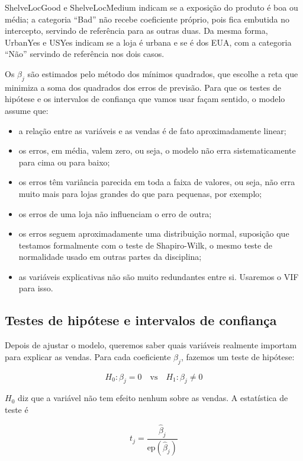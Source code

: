 \documentclass[a4paper]{modeloUFCG} %
\begin{document}
ShelveLocGood e ShelveLocMedium indicam se a exposição do produto é boa ou média; a categoria ``Bad'' não recebe coeficiente próprio, pois fica embutida no intercepto, servindo de referência para as outras duas. Da mesma forma, UrbanYes e USYes indicam se a loja é urbana e se é dos EUA, com a categoria ``Não'' servindo de referência nos dois casos.

Os \(\beta_j\) são estimados pelo método dos mínimos quadrados, que escolhe a reta que minimiza a soma dos quadrados dos erros de previsão. Para que os testes de hipótese e os intervalos de confiança que vamos usar façam sentido, o modelo assume que:

\begin{itemize}
\tightlist
\item
  a relação entre as variáveis e as vendas é de fato aproximadamente linear;
\item
  os erros, em média, valem zero, ou seja, o modelo não erra sistematicamente para cima ou para baixo;
\item
  os erros têm variância parecida em toda a faixa de valores, ou seja, não erra muito mais para lojas grandes do que para pequenas, por exemplo;
\item
  os erros de uma loja não influenciam o erro de outra;
\item
  os erros seguem aproximadamente uma distribuição normal, suposição que testamos formalmente com o teste de Shapiro-Wilk, o mesmo teste de normalidade usado em outras partes da disciplina;
\item
  as variáveis explicativas não são muito redundantes entre si. Usaremos o VIF para isso.
\end{itemize}

\subsection{Testes de hipótese e intervalos de confiança}\label{testes-de-hipuxf3tese-e-intervalos-de-confianuxe7a}

Depois de ajustar o modelo, queremos saber quais variáveis realmente importam para explicar as vendas. Para cada coeficiente \(\beta_j\), fazemos um teste de hipótese:

\[
H_0: \beta_j = 0 \quad \text{vs} \quad H_1: \beta_j \neq 0
\]

\(H_0\) diz que a variável não tem efeito nenhum sobre as vendas. A estatística de teste é

\[
t_j = \frac{\hat{\beta}_j}{\text{ep}(\hat{\beta}_j)}
\]
\end{document}
